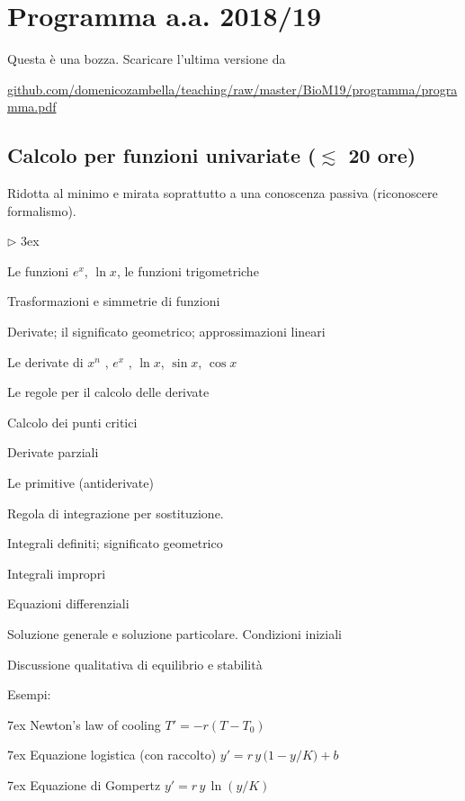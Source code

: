 \documentclass[10pt]{article}
\newcommand{\mylabel}[1]{#1\hfill}
\renewenvironment{itemize}
  {\begin{list}{$\triangleright$}{%
   \baselineskip3ex
   \setlength{\parskip}{4mm}
   \setlength{\topsep}{.4\baselineskip}
   \setlength{\rightmargin}{0mm}
   \setlength{\listparindent}{0mm}
   \setlength{\itemindent}{0mm}
   \setlength{\labelwidth}{2ex}
   \setlength{\itemsep}{.4\baselineskip}
   \setlength{\parsep}{0mm}
   \setlength{\partopsep}{0mm}
   \setlength{\labelsep}{1ex}
   \setlength{\leftmargin}{\labelwidth+\labelsep}
   \let\makelabel\mylabel}}{%
   \end{list}\vspace*{-1.3mm}}
\begin{document}
\section{Programma a.a. 2018/19}

Questa è una bozza. Scaricare l'ultima versione da\smallskip

\href{https://github.com/domenicozambella/teaching/raw/master/BioM19/programma/programma.pdf}{\small github.com/domenicozambella/teaching/raw/master/BioM19/programma/programma.pdf}



\subsection{Calcolo per funzioni univariate (\boldmath$\lesssim$ 20 ore)}

\colorbox{blue!10}{\begin{minipage}{\textwidth}
Ridotta al minimo e mirata soprattutto a una conoscenza passiva (riconoscere formalismo). 
\end{minipage}}



\begin{itemize}
\item Le funzioni $e^x$, $\ln x$, le funzioni trigometriche

\item Trasformazioni e simmetrie di funzioni

\item Derivate; il significato geometrico; approssimazioni lineari

      Le derivate di $x^n$ , $e^x$ , $\ln x$, $\sin x$, $\cos x$\hfill{}

      Le regole per il calcolo delle derivate\hfill{}
      
      Calcolo dei punti critici

      Derivate parziali\hfill{}
      
\item Le primitive (antiderivate)

Regola di integrazione per sostituzione.\hfill{}

Integrali definiti; significato geometrico

Integrali impropri

\item Equazioni differenziali \hfill{}

  Soluzione generale e soluzione particolare. Condizioni iniziali
  
  Discussione qualitativa di equilibrio e stabilità
  
  Esempi:\hfill{} 
  
  \noindent\kern7ex Newton's law of cooling $T' = -r(T-T_0)$
  
  \noindent\kern7ex Equazione logistica (con raccolto) $y' = r\, y\,\big(1- y/K\big) + b$
  
  \noindent\kern7ex Equazione di Gompertz $y' = r\, y\,\ln(y/K)$
\end{itemize}
\end{document}
